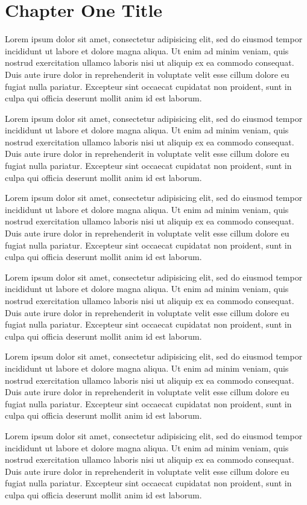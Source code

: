 \chapter{Chapter One Title}

Lorem ipsum dolor sit amet,
consectetur adipisicing elit,
sed do eiusmod tempor incididunt ut labore et dolore magna aliqua.
Ut enim ad minim veniam,
quis nostrud exercitation ullamco laboris nisi ut aliquip ex ea commodo consequat.
Duis aute irure dolor in reprehenderit in voluptate velit esse cillum dolore eu fugiat nulla pariatur.
Excepteur sint occaecat cupidatat non proident,
sunt in culpa qui officia deserunt mollit anim id est laborum.

Lorem ipsum dolor sit amet,
consectetur adipisicing elit,
sed do eiusmod tempor incididunt ut labore et dolore magna aliqua.
Ut enim ad minim veniam,
quis nostrud exercitation ullamco laboris nisi ut aliquip ex ea commodo consequat.
Duis aute irure dolor in reprehenderit in voluptate velit esse cillum dolore eu fugiat nulla pariatur.
Excepteur sint occaecat cupidatat non proident,
sunt in culpa qui officia deserunt mollit anim id est laborum.

Lorem ipsum dolor sit amet,
consectetur adipisicing elit,
sed do eiusmod tempor incididunt ut labore et dolore magna aliqua.
Ut enim ad minim veniam,
quis nostrud exercitation ullamco laboris nisi ut aliquip ex ea commodo consequat.
Duis aute irure dolor in reprehenderit in voluptate velit esse cillum dolore eu fugiat nulla pariatur.
Excepteur sint occaecat cupidatat non proident,
sunt in culpa qui officia deserunt mollit anim id est laborum.

Lorem ipsum dolor sit amet,
consectetur adipisicing elit,
sed do eiusmod tempor incididunt ut labore et dolore magna aliqua.
Ut enim ad minim veniam,
quis nostrud exercitation ullamco laboris nisi ut aliquip ex ea commodo consequat.
Duis aute irure dolor in reprehenderit in voluptate velit esse cillum dolore eu fugiat nulla pariatur.
Excepteur sint occaecat cupidatat non proident,
sunt in culpa qui officia deserunt mollit anim id est laborum.

Lorem ipsum dolor sit amet,
consectetur adipisicing elit,
sed do eiusmod tempor incididunt ut labore et dolore magna aliqua.
Ut enim ad minim veniam,
quis nostrud exercitation ullamco laboris nisi ut aliquip ex ea commodo consequat.
Duis aute irure dolor in reprehenderit in voluptate velit esse cillum dolore eu fugiat nulla pariatur.
Excepteur sint occaecat cupidatat non proident,
sunt in culpa qui officia deserunt mollit anim id est laborum.

Lorem ipsum dolor sit amet,
consectetur adipisicing elit,
sed do eiusmod tempor incididunt ut labore et dolore magna aliqua.
Ut enim ad minim veniam,
quis nostrud exercitation ullamco laboris nisi ut aliquip ex ea commodo consequat.
Duis aute irure dolor in reprehenderit in voluptate velit esse cillum dolore eu fugiat nulla pariatur.
Excepteur sint occaecat cupidatat non proident,
sunt in culpa qui officia deserunt mollit anim id est laborum.

